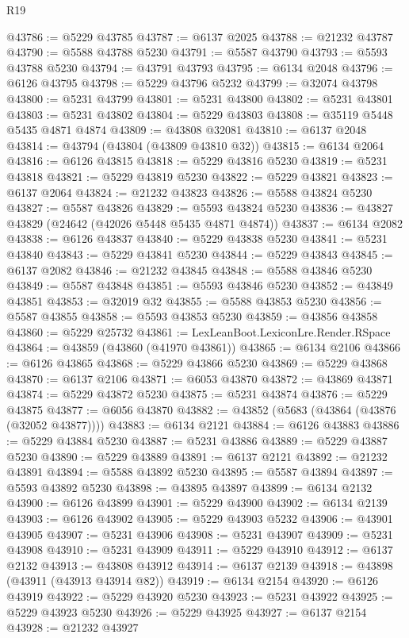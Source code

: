 \begin{lexlean}{R19}
\begin{coremodule}
@43786 := @5229 @43785
@43787 := @6137 @2025
@43788 := @21232 @43787
@43790 := @5588 @43788 @5230
@43791 := @5587 @43790
@43793 := @5593 @43788 @5230
@43794 := @43791 @43793
@43795 := @6134 @2048
@43796 := @6126 @43795
@43798 := @5229 @43796 @5232
@43799 := @32074 @43798
@43800 := @5231 @43799
@43801 := @5231 @43800
@43802 := @5231 @43801
@43803 := @5231 @43802
@43804 := @5229 @43803
@43808 := @35119 @5448 @5435 @4871 @4874
@43809 := @43808 @32081
@43810 := @6137 @2048
@43814 := @43794 (@43804 (@43809 @43810 @32))
@43815 := @6134 @2064
@43816 := @6126 @43815
@43818 := @5229 @43816 @5230
@43819 := @5231 @43818
@43821 := @5229 @43819 @5230
@43822 := @5229 @43821
@43823 := @6137 @2064
@43824 := @21232 @43823
@43826 := @5588 @43824 @5230
@43827 := @5587 @43826
@43829 := @5593 @43824 @5230
@43836 := @43827 @43829 (@24642 (@42026 @5448 @5435 @4871 @4874))
@43837 := @6134 @2082
@43838 := @6126 @43837
@43840 := @5229 @43838 @5230
@43841 := @5231 @43840
@43843 := @5229 @43841 @5230
@43844 := @5229 @43843
@43845 := @6137 @2082
@43846 := @21232 @43845
@43848 := @5588 @43846 @5230
@43849 := @5587 @43848
@43851 := @5593 @43846 @5230
@43852 := @43849 @43851
@43853 := @32019 @32
@43855 := @5588 @43853 @5230
@43856 := @5587 @43855
@43858 := @5593 @43853 @5230
@43859 := @43856 @43858
@43860 := @5229 @25732
@43861 := LexLeanBoot.LexiconLre.Render.RSpace
@43864 := @43859 (@43860 (@41970 @43861))
@43865 := @6134 @2106
@43866 := @6126 @43865
@43868 := @5229 @43866 @5230
@43869 := @5229 @43868
@43870 := @6137 @2106
@43871 := @6053 @43870
@43872 := @43869 @43871
@43874 := @5229 @43872 @5230
@43875 := @5231 @43874
@43876 := @5229 @43875
@43877 := @6056 @43870
@43882 := @43852 (@5683 (@43864 (@43876 (@32052 @43877))))
@43883 := @6134 @2121
@43884 := @6126 @43883
@43886 := @5229 @43884 @5230
@43887 := @5231 @43886
@43889 := @5229 @43887 @5230
@43890 := @5229 @43889
@43891 := @6137 @2121
@43892 := @21232 @43891
@43894 := @5588 @43892 @5230
@43895 := @5587 @43894
@43897 := @5593 @43892 @5230
@43898 := @43895 @43897
@43899 := @6134 @2132
@43900 := @6126 @43899
@43901 := @5229 @43900
@43902 := @6134 @2139
@43903 := @6126 @43902
@43905 := @5229 @43903 @5232
@43906 := @43901 @43905
@43907 := @5231 @43906
@43908 := @5231 @43907
@43909 := @5231 @43908
@43910 := @5231 @43909
@43911 := @5229 @43910
@43912 := @6137 @2132
@43913 := @43808 @43912
@43914 := @6137 @2139
@43918 := @43898 (@43911 (@43913 @43914 @82))
@43919 := @6134 @2154
@43920 := @6126 @43919
@43922 := @5229 @43920 @5230
@43923 := @5231 @43922
@43925 := @5229 @43923 @5230
@43926 := @5229 @43925
@43927 := @6137 @2154
@43928 := @21232 @43927

\end{coremodule}
\end{lexlean}
